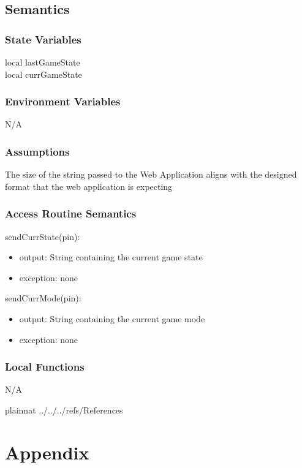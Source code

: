 \documentclass[12pt, titlepage]{article}
\begin{document}
    \subsection{Semantics}
    \subsubsection{State Variables}
    local lastGameState \\
    local currGameState 

    \subsubsection{Environment Variables}
    N/A

    \subsubsection{Assumptions}
    The size of the string passed to the Web Application aligns with the designed format that 
    the web application is expecting \\

    \subsubsection{Access Routine Semantics}
        \noindent sendCurrState(pin):
        \begin{itemize}
            \item output: String containing the current game state
            \item exception: none
        \end{itemize}
        \noindent sendCurrMode(pin):
        \begin{itemize}
            \item output: String containing the current game mode
            \item exception: none
        \end{itemize}

    \subsubsection{Local Functions}
    N/A

\newpage

 {plainnat}
 {../../../refs/References}

\newpage

\section{Appendix} \label{Appendix}

\end{document}
